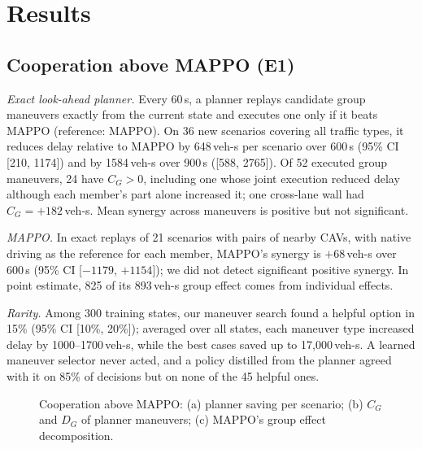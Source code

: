 \documentclass[conference]{IEEEtran}
\newcommand{\phbox}[1]{\fbox{\parbox[c][#1][c]{0.95\columnwidth}{\centering\Large \textcolor{red}{[to be filled in]}}}}
\begin{document}
\section{Results}

\subsection{Cooperation above MAPPO (E1)}
\emph{Exact look-ahead planner.} Every 60\,s, a planner replays candidate group maneuvers exactly from the current state and executes one only if it beats MAPPO (reference: MAPPO). On 36 new scenarios covering all traffic types, it reduces delay relative to MAPPO by 648\,veh-s per scenario over 600\,s (95\% CI [210, 1174]) and by 1584\,veh-s over 900\,s ([588, 2765]). %
Of 52 executed group maneuvers, 24 have $C_G>0$, including one whose joint execution reduced delay although each member's part alone increased it; one cross-lane wall had $C_G=+182$\,veh-s. %
Mean synergy across maneuvers is positive but not significant.

\emph{MAPPO.} In exact replays of 21 scenarios with pairs of nearby CAVs, with native driving as the reference for each member, MAPPO's synergy is $+68$\,veh-s over 600\,s (95\% CI [$-1179$, $+1154$]); we did not detect significant positive synergy. In point estimate, 825 of its 893\,veh-s group effect comes from individual effects. %

\emph{Rarity.} Among 300 training states, our maneuver search found a helpful option in 15\% (95\% CI [10\%, 20\%]); averaged over all states, each maneuver type increased delay by 1000--1700\,veh-s, while the best cases saved up to 17{,}000\,veh-s. %
A learned maneuver selector never acted, and a policy distilled from the planner agreed with it on 85\% of decisions but on none of the 45 helpful ones. %

\begin{figure}[t]
\centering
\phbox{4.2cm}
\caption{Cooperation above MAPPO: (a) planner saving per scenario; (b) $C_G$ and $D_G$ of planner maneuvers; (c) MAPPO's group effect decomposition.}
\label{fig:opportunity}
\end{figure}
\end{document}
